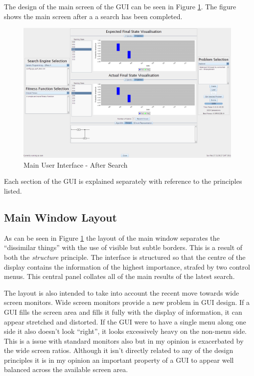 The design of the main screen of the GUI can be seen in Figure \ref{fig:MainGUIDesign}.
The figure shows the main screen after a a search has been completed.

\begin{figure}
 \includegraphics[width=\textwidth]{GUIDesign.png}
\caption{Main User Interface - After Search}
\label{fig:MainGUIDesign}
\end{figure}

Each section of the GUI is explained separately with reference to the principles listed.

\subsection{Main Window Layout}
As can be seen in Figure \ref{fig:MainGUIDesign} the layout of the main window separates the ``dissimilar things'' with the use of visible but subtle borders.
This is a result of both the \emph{structure} principle.
The interface is structured so that the centre of the display contains the information of the highest importance, strafed by two control menus.
This central panel collates all of the main results of the latest search.

The layout is also intended to take into account the recent move towards wide screen monitors.
Wide screen monitors provide a new problem in GUI design.
If a GUI fills the screen area and fills it fully with the display of information, it can appear stretched and distorted.
If the GUI were to have a single menu along one side it also doesn't look ``right'', it looks excessively heavy on the non-menu side.
This is a issue with standard monitors also but in my opinion is exacerbated by the wide screen ratios.
Although it isn't directly related to any of the design principles it is in my opinion an important property of a GUI to appear well balanced across the available screen area.

